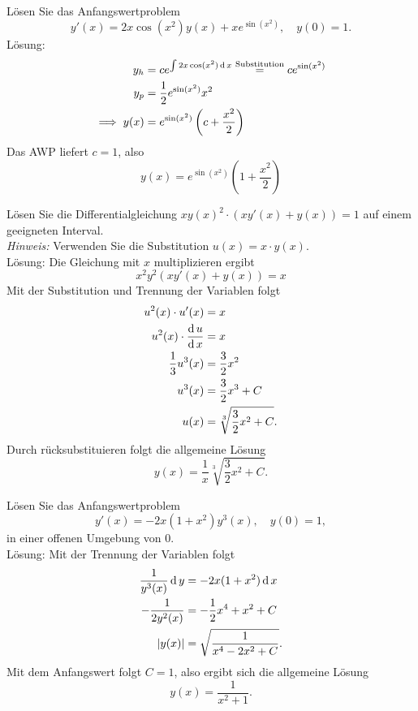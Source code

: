 \documentclass[parskip=full]{scrartcl}
\begin{document}
Lösen Sie das Anfangswertproblem 
\begin{displaymath}
  y'(x) = 2x \cos(x^2)y(x) + xe^{\sin(x^2)}, \quad y(0) = 1.
\end{displaymath}
Lösung:
\begin{align*}
  y_h &= ce^{\int 2x\cos(x^2) \operatorname{\mathop{}\!\mathrm{d}} x} \overset{\text{Substitution}}{=} ce^{\sin(x^2)}\\
  y_p &= \frac{1}{2} e^{\sin(x^2)} x^2\\
  \implies y(x) &= e^{\sin(x^2)} \left(c + \frac{x^2}{2}\right)
\end{align*}
Das AWP liefert $c = 1$, also
\begin{displaymath}
  y(x) = e^{\sin(x^2)} \left(1 + \frac{x^2}{2}\right)
\end{displaymath}

Lösen Sie die Differentialgleichung $xy(x)^2 \cdot (xy'(x) + y(x)) = 1$ auf einem geeigneten Interval.\\
\textit{Hinweis:}
Verwenden Sie die Substitution $u(x) = x \cdot y(x)$.\\
Lösung:
Die Gleichung mit $x$ multiplizieren ergibt
\begin{displaymath}
  x^2 y^2 (xy'(x) + y(x)) = x
\end{displaymath}
Mit der Substitution und Trennung der Variablen folgt
\begin{align*}
  u^2(x) \cdot u'(x) &= x\\
  u^2(x) \cdot \frac{\operatorname{\mathop{}\!\mathrm{d}} u}{\operatorname{\mathop{}\!\mathrm{d}} x} &= x\\
  \frac{1}{3} u^3(x)& = \frac{3}{2} x^2\\
  u^3(x) &= \frac{3}{2}x^3 + C\\
  u(x) &= \sqrt[3]{\frac{3}{2} x^2 + C}.
\end{align*}
Durch rücksubstituieren folgt die allgemeine Lösung
\begin{displaymath}
  y(x) = \frac{1}{x} \sqrt[3]{\frac{3}{2} x^2 + C}.
\end{displaymath}

Lösen Sie das Anfangswertproblem
\begin{displaymath}
  y'(x) = -2x(1 + x^2)y^3(x), \quad y(0) = 1,
\end{displaymath}
in einer offenen Umgebung von $0$.\\
Lösung:
Mit der Trennung der Variablen folgt
\begin{align*}
  \frac{1}{y^3(x)} \operatorname{\mathop{}\!\mathrm{d}} y &= -2x(1 + x^2) \operatorname{\mathop{}\!\mathrm{d}} x\\
  -\frac{1}{2y^2(x)} &= -\frac{1}{2} x^4 + x^2 + C\\
  |y(x)| &= \sqrt{\frac{1}{x^4 - 2x^2 + C}}.
\end{align*}
Mit dem Anfangswert folgt $C = 1$, also ergibt sich die allgemeine Lösung
\begin{displaymath}
  y(x) = \frac{1}{x^2 + 1}.
\end{displaymath}
\end{document}
